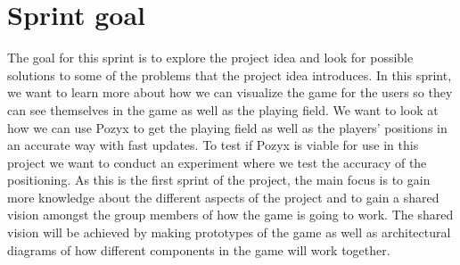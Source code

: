 \section{Sprint goal}\label{sec:sprint1-goals}
The goal for this sprint is to explore the project idea and look for possible solutions to some of the problems that the project idea introduces.
In this sprint, we want to learn more about how we can visualize the game for the users so they can see themselves in the game as well as the playing field.
We want to look at how we can use Pozyx to get the playing field as well as the players' positions in an accurate way with fast updates.
To test if Pozyx is viable for use in this project we want to conduct an experiment where we test the accuracy of the positioning.
As this is the first sprint of the project, the main focus is to gain more knowledge about the different aspects of the project and to gain a shared vision amongst the group members of how the game is going to work.
The shared vision will be achieved by making prototypes of the game as well as architectural diagrams of how different components in the game will work together.
